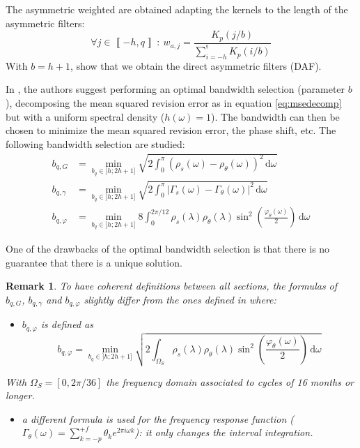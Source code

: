 \documentclass[
  12pt,
  ,
  a4paper]{article}
\providecommand{\tightlist}{%
  \setlength{\itemsep}{0pt}\setlength{\parskip}{0pt}}
\newcommand\1{\mathds{1}}
\newcommand\ud{\,\mathrm{d}}
\newtheorem*{remarque}{Remark}
\begin{document}
The asymmetric weighted are obtained adapting the kernels to the length of the asymmetric filters:
\[
\forall j\in\left\llbracket -h,q\right\rrbracket\::\: w_{a,j}=\frac{K_p(j/b)}{\sum_{i=-h}^{^q}K_p(i/b)}
\]
With \(b=h+1\), \textcite{proietti2008} show that we obtain the direct asymmetric filters (DAF).

In \textcite{dagumbianconcini2015}, the authors suggest performing an optimal bandwidth selection (parameter \(b\)), decomposing the mean squared revision error as in equation \eqref{eq:msedecomp} but with a uniform spectral density (\(h(\omega)=1\)).
The bandwidth can then be chosen to minimize the mean squared revision error, the phase shift, etc.
The following bandwidth selection are studied:
\begin{align*}
b_{q,G}&=\underset{b_q\in]h;2 h+1]}{\min}
\sqrt{2\int_{0}^{\pi}
\left(\rho_s(\omega)-\rho_\theta(\omega)\right)^{2}\ud \omega
}\\
b_{q,\gamma}&=\underset{b_q\in]h;2 h+1]}{\min}
\sqrt{2\int_{0}^{\pi}
\lvert \Gamma_s(\omega)-\Gamma_\theta(\omega)\rvert^2\ud \omega
} \\
b_{q,\varphi}&=\underset{b_q\in]h;2 h+1]}{\min}
8\int_{0}^{2\pi/12}
\rho_s(\lambda)\rho_\theta(\lambda)\sin^{2}\left(\frac{\varphi_\theta(\omega)}{2}\right)\ud \omega
\end{align*}

One of the drawbacks of the optimal bandwidth selection is that there is no guarantee that there is a unique solution.

\begin{remarque}

To have coherent definitions between all sections, the formulas of \(b_{q,G}\), \(b_{q,\gamma}\) and \(b_{q,\varphi}\) slightly differ from the ones defined in \textcite{dagumbianconcini2015} where:

\begin{itemize}
\tightlist
\item
  \(b_{q,\varphi}\) is defined as
  \[
  b_{q,\varphi}=\underset{b_q\in]h;2 h+1]}{\min}
  \sqrt{2\int_{\Omega_S}
  \rho_s(\lambda)\rho_\theta(\lambda)\sin^{2}\left(\frac{\varphi_\theta(\omega)}{2}\right)\ud \omega}
  \]
\end{itemize}

With \(\Omega_S=[0,2\pi/36]\) the frequency domain associated to cycles of 16 months or longer.

\begin{itemize}
\tightlist
\item
  a different formula is used for the frequency response function (\(\Gamma_\theta(\omega)=\sum_{k=-p}^{+f} \theta_k e^{2\pi i \omega k}\)): it only changes the interval integration.
\end{itemize}

\end{remarque}
\end{document}

